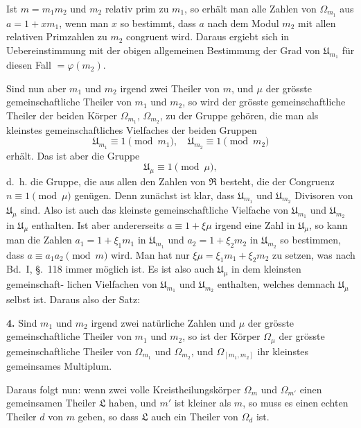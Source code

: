 \documentclass[12pt,a4paper]{article}
\theoremstyle{plain}
\theoremstyle{definition}
\theoremstyle{remark}
\begin{document}
Ist $m = m_1 m_2$ und $m_2$ relativ prim zu $m_1$, so erhält man
alle Zahlen von $\Omega_{m_1}$ aus $a = 1 + xm_1$, wenn man $x$ so bestimmt,
dass $a$ nach dem Modul $m_2$ mit allen relativen Primzahlen zu
$m_2$ congruent wird. Daraus ergiebt sich in Uebereinstimmung
mit der obigen allgemeinen Bestimmung der Grad von $\mathfrak{U}_{m_1}$ für
diesen Fall $= \varphi(m_2)$.

Sind nun aber $m_1$ und $m_2$ irgend zwei Theiler von $m$, und
$\mu$ der grösste gemeinschaftliche Theiler von $m_1$ und $m_2$, so wird
der grösste gemeinschaftliche Theiler der beiden Körper $\Omega_{m_1}$, $\Omega_{m_2}$,
zu der Gruppe gehören, die man als kleinstes gemeinschaftliches
Vielfaches der beiden Gruppen
\begin{equation}\tag{6}
\mathfrak{U}_{m_1} \equiv 1 \pmod{m_1}, \quad \mathfrak{U}_{m_2} \equiv 1 \pmod{m_2}
\end{equation}
erhält. Das ist aber die Gruppe
\begin{equation}\tag{7}
\mathfrak{U}_\mu \equiv 1 \pmod{\mu},
\end{equation}
d.~h. die Gruppe, die aus allen den Zahlen von $\mathfrak{R}$ besteht, die
der Congruenz $n \equiv 1 \pmod{\mu}$ genügen. Denn zunächst ist klar,
dass $\mathfrak{U}_{m_1}$ und $\mathfrak{U}_{m_2}$ Divisoren von $\mathfrak{U}_\mu$ sind. Also ist auch das kleinste
gemeinschaftliche Vielfache von $\mathfrak{U}_{m_1}$ und $\mathfrak{U}_{m_2}$ in $\mathfrak{U}_\mu$ enthalten.
Ist aber andererseits $a \equiv 1 + \xi\mu$ irgend eine Zahl in $\mathfrak{U}_\mu$, so
kann man die Zahlen $a_1 = 1 + \xi_1 m_1$ in $\mathfrak{U}_{m_1}$ und $a_2 = 1 + \xi_2 m_2$
in $\mathfrak{U}_{m_2}$ so bestimmen, dass $a \equiv a_1 a_2 \pmod{m}$ wird. Man hat
nur $\xi\mu = \xi_1 m_1 + \xi_2 m_2$ zu setzen, was nach Bd.~I, \S.~118 immer
möglich ist. Es ist also auch $\mathfrak{U}_\mu$ in dem kleinsten gemeinschaft-
lichen Vielfachen von $\mathfrak{U}_{m_1}$ und $\mathfrak{U}_{m_2}$ enthalten, welches demnach
$\mathfrak{U}_\mu$ selbst ist. Daraus also der Satz:

\textbf{4.} Sind $m_1$ und $m_2$ irgend zwei natürliche Zahlen
und $\mu$ der grösste gemeinschaftliche Theiler von
$m_1$ und $m_2$, so ist der Körper $\Omega_\mu$ der grösste
gemeinschaftliche Theiler von $\Omega_{m_1}$ und $\Omega_{m_2}$, und
$\Omega_{[m_1, m_2]}$ ihr kleinstes gemeinsames Multiplum.

Daraus folgt nun: wenn zwei volle Kreistheilungskörper $\Omega_m$
und $\Omega_{m'}$ einen gemeinsamen Theiler $\mathfrak{L}$ haben, und $m'$ ist kleiner
als $m$, so muss es einen echten Theiler $d$ von $m$ geben, so dass
$\mathfrak{L}$ auch ein Theiler von $\Omega_d$ ist.
\end{document}
